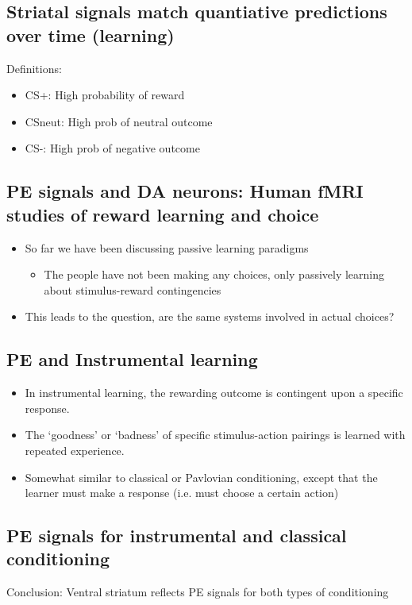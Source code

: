\subsection{Striatal signals match quantiative predictions over time (learning)}
Definitions:
\begin{itemize}
    \item CS+: High probability of reward
    \item CSneut: High prob of neutral outcome
    \item CS-: High prob of negative outcome
\end{itemize}

\subsection{PE signals and DA neurons: Human fMRI studies of reward learning and choice}
\begin{itemize}
    \item So far we have been discussing passive learning paradigms
    \begin{itemize}
        \item The people have not been making any choices, only passively learning about stimulus-reward contingencies
        
    \end{itemize}
    \item This leads to the question, are the same systems involved in actual choices?
\end{itemize}

\subsection{PE and Instrumental learning}
\begin{itemize}
    \item In instrumental learning, the rewarding outcome is contingent upon a specific response.
    \item The ‘goodness’ or ‘badness’ of specific stimulus-action pairings is learned with repeated experience.
    \item Somewhat similar to classical or Pavlovian conditioning, except that the learner must make a response (i.e. must choose a certain action)
\end{itemize}
\subsection{PE signals for instrumental and classical conditioning}
Conclusion: Ventral striatum reflects PE signals for both types of conditioning

